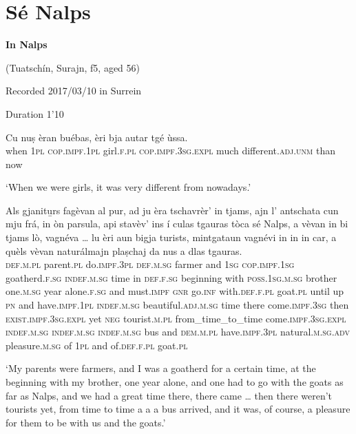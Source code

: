 \section{Sé Nalps}\label{sec:8.10}

\noindent
\textbf{In Nalps}

\noindent
(Tuatschín, Surajn, f5, aged 56)

\noindent
Recorded 2017/03/10 in Surrein

\noindent
Duration 1'10
\bigskip

\begin{linenumbers}
\gll    Cu nuṣ èran buébas, èri bja autar tgé ùssa. \\
 when \textsc{1pl} \textsc{cop.impf.1pl} girl.\textsc{f.pl} \textsc{cop.impf.3sg.expl} much different.\textsc{adj.unm} than now \\
\end{linenumbers}
\medskip
\glt `When we were girls, it was very different from nowadays.'
\medskip

\begin{linenumbers}
\gll    Als gjanitu̱rs fagèvan al pur, ad ju èra tschavrèr’ in tjams, ajn l’ antschata cun mju frá, in òn parsula, api stavèv’ ins í culas tgauras tòca sé Nalps, a vèvan in bi tjams lò, vagnéva … lu èri aun bigja turists, mintgataun vagnévi in in in car, a quèls vèvan naturálmajn plaṣchaj da nus a dlas tgauras. \\
\textsc{def.m.pl} parent.\textsc{pl} do.\textsc{impf.3pl} \textsc{def.m.sg} farmer and \textsc{1sg} \textsc{cop.impf.1sg} goatherd.\textsc{f.sg} \textsc{indef.m.sg} time in \textsc{def.f.sg} beginning with \textsc{poss.1sg.m.sg} brother one.\textsc{m.sg} year alone.\textsc{f.sg} and must.\textsc{impf} \textsc{gnr} go.\textsc{inf} with.\textsc{def.f.pl} goat.\textsc{pl} until up \textsc{pn} and have.\textsc{impf.1pl} \textsc{indef.m.sg} beautiful.\textsc{adj.m.sg} time there come.\textsc{impf.3sg} {} then \textsc{exist.impf.3sg.expl} yet \textsc{neg} tourist.\textsc{m.pl} from\_time\_to\_time come.\textsc{impf.3sg.expl} \textsc{indef.m.sg} \textsc{indef.m.sg} \textsc{indef.m.sg} bus and \textsc{dem.m.pl} have.\textsc{impf.3pl} natural.\textsc{m.sg.adv}  pleasure.\textsc{m.sg} of \textsc{1pl} and of.\textsc{def.f.pl} goat.\textsc{pl} \\
\end{linenumbers}
\medskip
\glt `My parents were farmers, and I was a goatherd for a certain time, at the beginning with my brother, one year alone, and one had to go with the goats as far as Nalps, and we had a great time there, there came … then there weren’t tourists yet, from time to time a a a bus arrived, and it was, of course, a pleasure for them to be with us and the goats.'
\medskip

